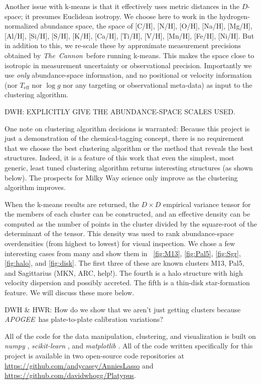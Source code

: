 \documentclass[12pt, letterpaper, preprint]{aastex}
\newcommand{\acronym}[1]{{\small{#1}}}
\newcommand{\project}[1]{\textsl{#1}}
\newcommand{\apogee}{\project{\acronym{APOGEE}}}
\newcommand{\thecannon}{\project{The~Cannon}}
\newcommand{\teff}{T_{\mathrm{eff}}}
\newcommand{\logg}{\log g}
\begin{document}
Another issue with k-means is that it effectively uses metric
distances in the $D$-space; it presumes Euclidean isotropy.
We choose here to work in the hydrogen-normalized abundance space, the
space of [C/H], [N/H], [O/H], [Na/H], [Mg/H], [Al/H], [Si/H], [S/H],
[K/H], [Ca/H], [Ti/H], [V/H], [Mn/H], [Fe/H], [Ni/H].
But in addition to this, we re-scale these by approximate measurement
precisions obtained by \thecannon\ before running k-means.
This makes the space close to isotropic in measurement uncertainty or
observational precision.
Importantly we use \emph{only} abundance-space information, and no
positional or velocity information (nor $\teff$ nor $\logg$ nor any
targeting or observational meta-data) as input to the clustering
algorithm.

DWH: EXPLICITLY GIVE THE ABUNDANCE-SPACE SCALES USED.

One note on clustering algorithm decisions is warranted:
Because this project is just a demonstration of the chemical-tagging
concept, there is no requirement that we choose the best clustering
algorithm or the method that reveals the best structures.
Indeed, it is a feature of this work that even the simplest, most
generic, least tuned clustering algorithm returns interesting
structures (as shown below).
The prospects for Milky Way science only improve as the clustering
algorithm improves.

When the k-means results are returned, the $D\times D$ empirical
variance tensor for the members of each cluster can be constructed,
and an effective density can be computed as the number of points in
the cluster divided by the square-root of the determinant of the
tensor.
This density was used to rank abundance-space overdensities (from highest
to lowest) for visual inspection.
We chose a few interesting cases from many and show them in
\figurename~\ref{fig:M13}, \ref{fig:Pal5}, \ref{fig:Sgr},
\ref{fig:halo}, and \ref{fig:disk}.
The first three of these are known clusters M13, Pal5, and Sagittarius (MKN, ARC, help!).
The fourth is a halo structure with high velocity dispersion and possibly accreted.
The fifth is a thin-disk star-formation feature.
We will discuss these more below.

DWH \& HWR: How do we show that we aren't just getting clusters because \apogee\ has plate-to-plate calibration variations?

All of the code for the data manipulation, clustering, and
visualization is built on \project{numpy} \citep{numpy},
\project{scikit-learn} \citep{sklearn}, and \project{matplotlib}
\citep{matplotlib}.
All of the code written specifically for this project is available in
two open-source code repositories at
\url{https://github.com/andycasey/AnniesLasso} and
\url{https://github.com/davidwhogg/Platypus}.
\end{document}
